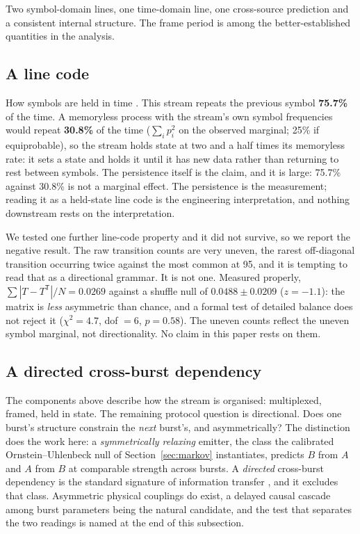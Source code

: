 \documentclass[11pt,a4paper]{article}
\newcommand{\bnum}[1]{\textbf{#1}}
\begin{document}
Two symbol-domain lines, one time-domain line, one cross-source prediction and a
consistent internal structure. The frame period is among the better-established
quantities in the analysis.

\subsection{A line code}

How symbols are held in time \cite{proakis2008}. This stream repeats the previous symbol
\bnum{75.7\%} of the time. A memoryless process with the stream's own symbol
frequencies would repeat \bnum{30.8\%} of the time ($\sum_i p_i^2$ on the observed
marginal; 25\% if equiprobable), so the stream holds state at two and a half times
its memoryless rate: it sets a
state and holds it until it has new data rather than returning to rest between symbols.
The persistence itself is the claim, and it is large: 75.7\% against 30.8\% is not a
marginal effect. The persistence is the measurement; reading it as a held-state line
code is the engineering interpretation, and nothing downstream rests on the
interpretation.

We tested one further line-code property and it did not survive, so we report the
negative result. The raw transition counts are very uneven, the rarest off-diagonal
transition occurring twice against the most common at 95, and it is tempting to read
that as a directional grammar. It is not one. Measured properly,
$\sum|T - T^{\mathsf{T}}|/N = 0.0269$ against a shuffle null of $0.0488 \pm 0.0209$
($z = -1.1$): the matrix is \emph{less} asymmetric than chance, and a formal test of
detailed balance does not reject it ($\chi^2 = 4.7$, dof $= 6$, $p = 0.58$). The uneven
counts reflect the uneven symbol marginal, not directionality. No claim in this paper
rests on them.

\subsection{A directed cross-burst dependency}
\label{sec:directed}

The components above describe how the stream is organised: multiplexed, framed, held in
state. The remaining protocol question is directional. Does one burst's structure
constrain the \emph{next} burst's, and asymmetrically? The distinction does the work
here: a \emph{symmetrically relaxing} emitter, the class the calibrated
Ornstein--Uhlenbeck null of Section~\ref{sec:markov} instantiates, predicts $B$ from
$A$ and $A$ from $B$ at comparable strength across bursts. A \emph{directed}
cross-burst dependency is the standard signature of information transfer
\cite{schreiber2000}, and it excludes that class. Asymmetric physical couplings do
exist, a delayed causal cascade among burst parameters being the natural candidate,
and the test that separates the two readings is named at the end of this subsection.
\end{document}
